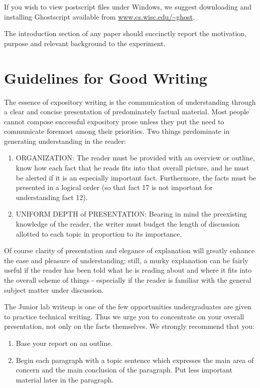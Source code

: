 \documentclass[aps,twocolumn,secnumarabic,nobalancelastpage,amsmath,amssymb,nofootinbib]{revtex4}
\begin{document}
If you wish to view postscript files under Windows, we
suggest downloading and installing Ghostscript available from
\url{www.cs.wisc.edu/~ghost}.

The introduction section of any paper should succinctly report 
the motivation, purpose and relevant background to the experiment.
\section{Guidelines for Good Writing \cite{pritchard1990}}

The essence of expository writing is the communication of
understanding through a clear and concise presentation of
predominately factual material. Most people cannot compose
successful expository prose unless they put the need to communicate
foremost among their priorities. Two things predominate in
generating understanding in the reader:
\begin{enumerate}
\item ORGANIZATION: The reader must be provided with an overview or
outline, know how each fact that he reads fits into that overall
picture, and he must be alerted if it is an especially important
fact. Furthermore, the facts must be presented in a logical order
(so that fact 17 is not important for understanding fact 12).

\item UNIFORM DEPTH of PRESENTATION: Bearing in mind the preexisting
knowledge of the reader, the writer must budget the length of
discussion allotted to each topic in proportion to its importance.

\end{enumerate}

Of course clarity of presentation and elegance of explanation will
greatly enhance the ease and pleasure of understanding; still, a
murky explanation can be fairly useful if the reader has been told
what he is reading about and where it fits into the overall scheme
of things - especially if the reader is familiar with the general
subject matter under discussion.

The Junior lab writeup is one of the few opportunities
undergraduates are given to practice technical writing. Thus we urge
you to concentrate on your overall presentation, not only on the
facts themselves. We strongly recommend that you:
\begin{enumerate}
\item Base your report on an outline.
\item Begin each paragraph with a topic sentence which expresses the
main area of concern and the main conclusion of the paragraph. Put
less important material later in the paragraph.
\end{enumerate}
\end{document}

